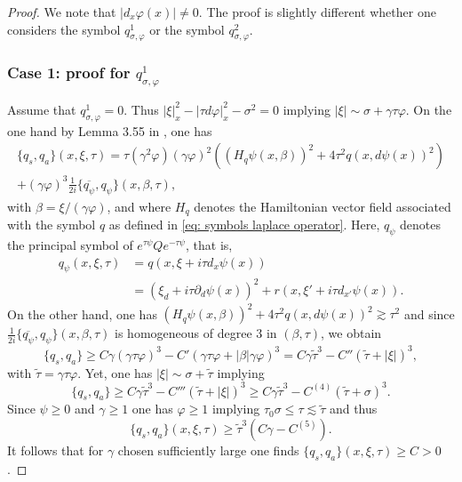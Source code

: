 \documentclass[JEP,XML,SOM,Unicode,published]{cedram}
\theoremstyle{plain}
\theoremstyle{definition}
\newcommand{\suff}{sufficiently\xspace}
\let\csp\gamma
\newcommand{\ovl}[1]{\overline{#1}}
\newcommand{\qconj}{q_{\sigma,\varphi}}
\newcommand{\qs}{q_{s}}
\newcommand{\qa}{q_{a}}
\begin{document}
\begin{proof}
We note that $|d_x \varphi(x)|\neq0$.
The proof is slightly different whether one considers the symbol
$\qconj^1$ or the symbol $\qconj^2$.

\subsubsection*{Case 1: proof for ${\qconj^1}$}
Assume that
$\qconj^1=0$. Thus $|\xi|_x^2-|\tau
d\varphi|_x^2-\sigma^2=0$ implying $|\xi|\sim \sigma+\csp\tau\varphi$. On the one hand by Lemma 3.55 in \cite{JGL-vol1}, one has
\begin{multline}\label{mes1}
\{\qs, \qa\}(x,\xi,\tau)
=\tau(\csp^2\varphi)(\csp\varphi)^2\left((H_{q}\psi(x,\beta))^2+4\tau^2 q(x, d\psi(x))^2\right) \\
+(\csp\varphi)^3\frac{1}{2i}\{\ovl{q_{\psi}}, q_{\psi}\}(x,\beta,\tau),
\end{multline}
with $\beta = \xi /(\csp\varphi)$, and where $H_q$ denotes the
Hamiltonian vector field associated with the symbol $q$ as defined in
\eqref{eq: symbols laplace operator}. Here, $q_\psi$ denotes the
principal symbol of $e^{\tau \psi} Q e^{-\tau \psi}$, that is,
\begin{align*}
q_\psi (x,\xi, \tau)
&= q(x,\xi + i \tau d_x \psi(x))\\
&= (\xi_d + i \tau \partial_d \psi(x))^2 + r(x,\xi' +
i \tau d_{x'} \psi(x)).
\end{align*}
On the other hand, one has $(H_{q}\psi(x,\beta))^2+4\tau^2 q(x,
d\psi(x))^2\gtrsim \tau^2$ and since
$\frac{1}{2i}\{\ovl{q_{\psi}}, q_{\psi}\}(x,\beta,\tau)$ is
homogeneous of degree $3$ in $(\beta,\tau)$, we obtain
\begin{equation*}
\{\qs, \qa\}
\geq C \csp(\csp\tau\varphi)^3
-C' (\csp\tau\varphi+|\beta|\csp\varphi)^3
=C\csp\tilde{\tau}^3
-C''(\tilde{\tau}+|\xi|)^3,
\end{equation*}
with $\tilde{\tau}=\csp\tau\varphi$.
Yet, one has $|\xi|\sim\sigma+\tilde{\tau}$ implying
\begin{equation*}
\{\qs, \qa\}
\geq C\csp\tilde{\tau}^3
-C'''(\tilde{\tau}+|\xi|)^3
\geq C \csp\tilde{\tau}^3-C^{(4)}(\tilde{\tau}+\sigma)^3.
\end{equation*}
Since $\psi\geq 0$ and $\csp\geq 1$ one has $\varphi\geq1$ implying
$\tau_0 \sigma \leq\tau\lesssim\tilde{\tau}$ and thus
\begin{equation*}
\{\qs, \qa\}(x,\xi,\tau)\geq \tilde{\tau}^3(C\csp-C^{(5)}).
\end{equation*}
It follows that for $\csp$ chosen \suff large one finds $\{\qs, \qa\}(x,\xi,\tau)\geq C>0$.


\end{proof}
\end{document}
